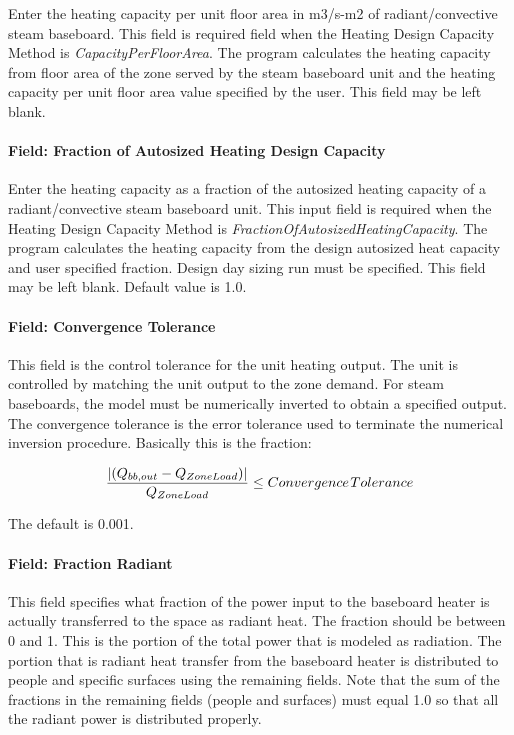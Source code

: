 Enter the heating capacity per unit floor area in m3/s-m2 of radiant/convective steam baseboard. This field is required field when the Heating Design Capacity Method is \emph{CapacityPerFloorArea}. The program calculates the heating capacity from floor area of the zone served by the steam baseboard unit and the heating capacity per unit floor area value specified by the user. This field may be left blank.

\paragraph{Field: Fraction of Autosized Heating Design Capacity}\label{field-fraction-of-autosized-heating-design-capacity-1-000}

Enter the heating capacity as a fraction of the autosized heating capacity of a radiant/convective steam baseboard unit. This input field is required when the Heating Design Capacity Method is \emph{FractionOfAutosizedHeatingCapacity}. The program calculates the heating capacity from the design autosized heat capacity and user specified fraction. Design day sizing run must be specified. This field may be left blank. Default value is 1.0.

\paragraph{Field: Convergence Tolerance}\label{field-convergence-tolerance-1-000}

This field is the control tolerance for the unit heating output. The unit is controlled by matching the unit output to the zone demand. For steam baseboards, the model must be numerically inverted to obtain a specified output. The convergence tolerance is the error tolerance used to terminate the numerical inversion procedure. Basically this is the fraction:

\begin{equation}
\frac{{\left| {({Q_{bb,out}} - {Q_{ZoneLoad}})} \right|}}{{{Q_{ZoneLoad}}}} \le Convergence{\kern 1pt} Tolerance
\end{equation}

The default is 0.001.

\paragraph{Field: Fraction Radiant}\label{field-fraction-radiant-1-000}

This field specifies what fraction of the power input to the baseboard heater is actually transferred to the space as radiant heat. The fraction should be between 0 and 1. This is the portion of the total power that is modeled as radiation. The portion that is radiant heat transfer from the baseboard heater is distributed to people and specific surfaces using the remaining fields. Note that the sum of the fractions in the remaining fields (people and surfaces) must equal 1.0 so that all the radiant power is distributed properly.

